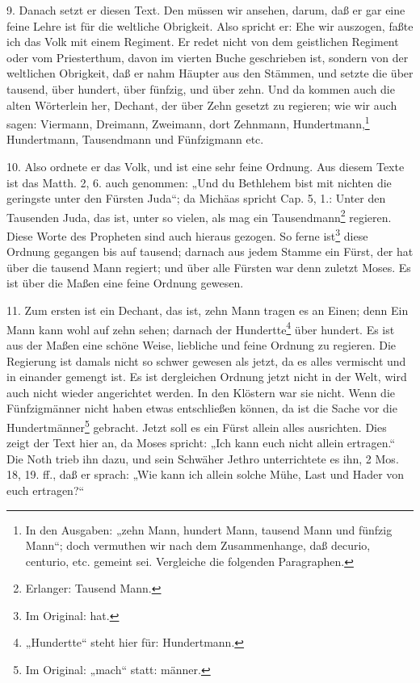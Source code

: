 9. Danach setzt er diesen Text. Den müssen wir ansehen, darum, daß er gar eine feine Lehre ist für die weltliche Obrigkeit. Also spricht er: Ehe wir auszogen, faßte ich das Volk mit einem Regiment. Er redet nicht von dem geistlichen Regiment oder vom Priesterthum, davon im vierten Buche geschrieben ist, sondern von der weltlichen Obrigkeit, daß er nahm Häupter aus den Stämmen, und setzte die über tausend, über hundert, über fünfzig, und über zehn. Und da kommen auch die alten Wörterlein her, Dechant, der über Zehn gesetzt zu regieren; wie wir auch sagen: Viermann, Dreimann, Zweimann, dort Zehnmann, Hundertmann,\footnote{In den Ausgaben: „zehn Mann, hundert Mann, tausend Mann und fünfzig Mann“; doch vermuthen wir nach dem Zusammenhange, daß decurio, centurio, etc. gemeint sei. Vergleiche die folgenden Paragraphen.} Hundertmann, Tausendmann und Fünfzigmann etc.

10. Also ordnete er das Volk, und ist eine sehr feine Ordnung. Aus diesem Texte ist das Matth. 2, 6. auch genommen: „Und du Bethlehem bist mit nichten die geringste unter den Fürsten Juda“; da Michäas spricht Cap. 5, 1.: Unter den Tausenden Juda, das ist, unter so vielen, als mag ein Tausendmann\footnote{Erlanger: Tausend Mann.} regieren. Diese Worte des Propheten sind auch hieraus gezogen. So ferne ist\footnote{Im Original: hat.} diese Ordnung gegangen bis auf tausend; darnach aus jedem Stamme ein Fürst, der hat über die tausend Mann regiert; und über alle Fürsten war denn zuletzt Moses. Es ist über die Maßen eine feine Ordnung gewesen.

11. Zum ersten ist ein Dechant, das ist, zehn Mann tragen es an Einen; denn Ein Mann kann wohl auf zehn sehen; darnach der Hundertte\footnote{„Hundertte“ steht hier für: Hundertmann.} über hundert. Es ist aus der Maßen eine schöne Weise, liebliche und feine Ordnung zu regieren. Die Regierung ist damals nicht so schwer gewesen als jetzt, da es alles vermischt und in einander gemengt ist. Es ist dergleichen Ordnung jetzt nicht in der Welt, wird auch nicht wieder angerichtet werden. In den Klöstern war sie nicht. Wenn die Fünfzigmänner nicht haben etwas entschließen können, da ist die Sache vor die Hundertmänner\footnote{Im Original: „mach“ statt: männer.} gebracht. Jetzt soll es ein Fürst allein alles ausrichten. Dies zeigt der Text hier an, da Moses spricht: „Ich kann euch nicht allein ertragen.“ Die Noth trieb ihn dazu, und sein Schwäher Jethro unterrichtete es ihn, 2 Mos. 18, 19. ff., daß er sprach: „Wie kann ich allein solche Mühe, Last und Hader von euch ertragen?“

